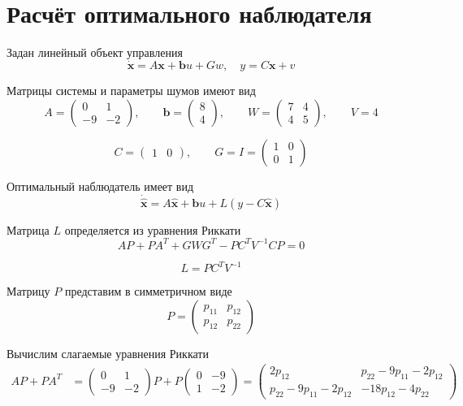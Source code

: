 
\section{Расчёт оптимального наблюдателя}

Задан линейный объект управления
\[
\dot{\bm x}=A\bm x+\bm b u+Gw,\quad
y=C\bm x+v
\]

Матрицы системы и параметры шумов имеют вид
\[
A=\begin{pmatrix}
0&1\\
-9&-2
\end{pmatrix},
\qquad
\bm b=\begin{pmatrix}8\\4\end{pmatrix},
\qquad
W=\begin{pmatrix}7&4\\4&5\end{pmatrix},
\qquad V=4
\]

\[
C=\begin{pmatrix}1&0\end{pmatrix},
\qquad
G=I=\begin{pmatrix}1&0\\0&1\end{pmatrix}
\]

Оптимальный наблюдатель имеет вид
\[
\dot{\hat{\bm x}}=
A\hat{\bm x}+\bm b u+L(y-C\hat{\bm x})
\]

Матрица $L$ определяется из уравнения Риккати
\[
AP+PA^T+GWG^T-PC^TV^{-1}CP=0
\]

\[
L=PC^TV^{-1}
\]

Матрицу $P$ представим в симметричном виде
\[
P=\begin{pmatrix}
p_{11}&p_{12}\\
p_{12}&p_{22}
\end{pmatrix}
\]

Вычислим слагаемые уравнения Риккати
\[
\begin{aligned}
AP+PA^T
&=
\begin{pmatrix}
0&1\\-9&-2
\end{pmatrix}P+
P\begin{pmatrix}
0&-9\\1&-2
\end{pmatrix}=
\begin{pmatrix}
2p_{12}&p_{22}-9p_{11}-2p_{12}\\
p_{22}-9p_{11}-2p_{12}&-18p_{12}-4p_{22}
\end{pmatrix}
\end{aligned}
\]

